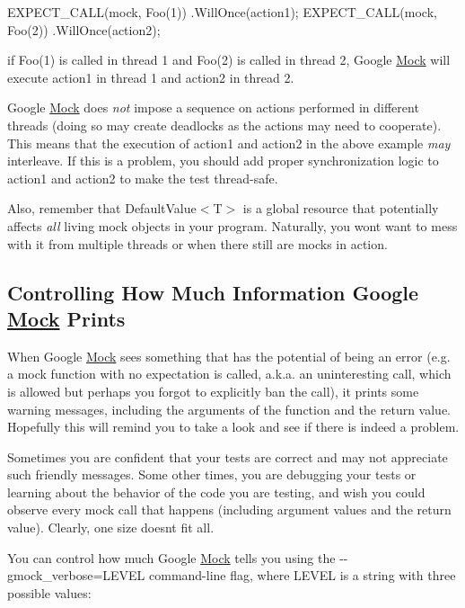 \begin{DoxyCode}
EXPECT\_CALL(mock, Foo(1))
    .WillOnce(action1);
EXPECT\_CALL(mock, Foo(2))
    .WillOnce(action2);
\end{DoxyCode}


if {\ttfamily Foo(1)} is called in thread 1 and {\ttfamily Foo(2)} is called in thread 2, Google \hyperlink{classMock}{Mock} will execute {\ttfamily action1} in thread 1 and {\ttfamily action2} in thread 2.

Google \hyperlink{classMock}{Mock} does {\itshape not} impose a sequence on actions performed in different threads (doing so may create deadlocks as the actions may need to cooperate). This means that the execution of {\ttfamily action1} and {\ttfamily action2} in the above example {\itshape may} interleave. If this is a problem, you should add proper synchronization logic to {\ttfamily action1} and {\ttfamily action2} to make the test thread-\/safe.

Also, remember that {\ttfamily Default\+Value$<$T$>$} is a global resource that potentially affects {\itshape all} living mock objects in your program. Naturally, you won\textquotesingle{}t want to mess with it from multiple threads or when there still are mocks in action.

\subsection*{Controlling How Much Information Google \hyperlink{classMock}{Mock} Prints}

When Google \hyperlink{classMock}{Mock} sees something that has the potential of being an error (e.\+g. a mock function with no expectation is called, a.\+k.\+a. an uninteresting call, which is allowed but perhaps you forgot to explicitly ban the call), it prints some warning messages, including the arguments of the function and the return value. Hopefully this will remind you to take a look and see if there is indeed a problem.

Sometimes you are confident that your tests are correct and may not appreciate such friendly messages. Some other times, you are debugging your tests or learning about the behavior of the code you are testing, and wish you could observe every mock call that happens (including argument values and the return value). Clearly, one size doesn\textquotesingle{}t fit all.

You can control how much Google \hyperlink{classMock}{Mock} tells you using the {\ttfamily -\/-\/gmock\+\_\+verbose=L\+E\+V\+EL} command-\/line flag, where {\ttfamily L\+E\+V\+EL} is a string with three possible values\+:


